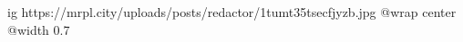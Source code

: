  
 
 
 
 

\ifcmt
  ig https://mrpl.city/uploads/posts/redactor/1tumt35tsecfjyzb.jpg
  @wrap center
  @width 0.7
\fi
